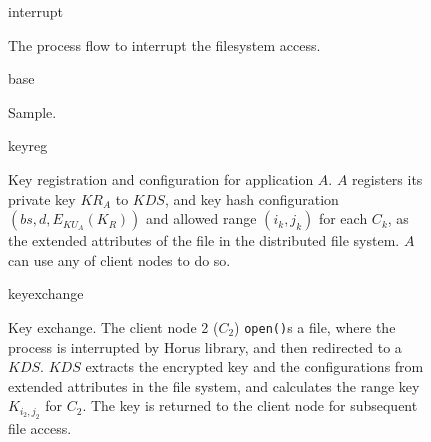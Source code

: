 \documentclass{article}
\def\gpicbox#1{%
\vbox{\unvbox\csname #1\endcsname\kern 0pt}}
\newcommand{\gpicfig}[2]{%

\begin{figure}
\begin{center}
\leavevmode
\gpicbox{#1}
\caption{#2}
\label{fig:#1}
\end{center}
\end{figure}
}
\begin{document}
\gpicfig{interrupt}{The process flow to interrupt the filesystem access.}

\gpicfig{base}{Sample.}

\gpicfig{keyreg}{Key registration and configuration for application $A$.
$A$ registers its private key $KR_A$ to $KDS$, and key hash configuration
$(bs,d,E_{KU_A}(K_R))$ and allowed range $(i_k,j_k)$ for each $C_k$,
as the extended attributes of the file in the distributed file system.
$A$ can use any of client nodes to do so.}

\gpicfig{keyexchange}{Key exchange. The client node 2 ($C_2$) \texttt{open()}s
a file, where the process is interrupted by Horus library, and then
redirected to a $KDS$.
$KDS$ extracts the encrypted key and the configurations from extended
attributes in the file system, and calculates the range key $K_{i_2,j_2}$
for $C_2$. The key is returned to the client node for subsequent
file access.}
\end{document}
